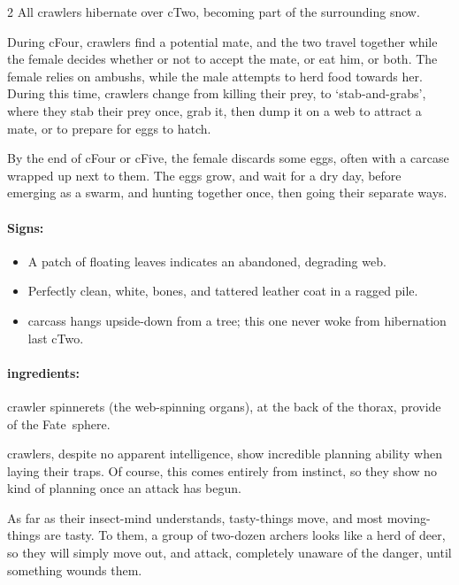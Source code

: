 \begin{multicols}{2}
All \glspl{crawler} hibernate over \gls{cTwo}, becoming part of the surrounding snow.

During \gls{cFour}, \glspl{crawler} find a potential mate, and the two travel together while the female decides whether or not to accept the mate, or eat him, or both.
The female relies on \glspl{ambush}, while the male attempts to herd food towards her.
During this time, \glspl{crawler} change from killing their prey, to `stab-and-grabs', where they stab their prey once, grab it,%
then dump it on a web to attract a mate, or to prepare for eggs to hatch.

By the end of \gls{cFour} or \gls{cFive}, the female discards some eggs, often with a carcase wrapped up next to them.
The eggs grow, and wait for a dry day, before emerging as a swarm, and hunting together once, then going their separate ways.

\crawlerSwarm
\label{crawlerSwarm}


\paragraph{Signs:}

\begin{itemize}
  \item
  A patch of floating leaves indicates an abandoned, degrading web.
  \item
  Perfectly clean, white, bones, and tattered leather coat in a ragged pile.
  \item
   carcass hangs upside-down from a tree; this one never woke from hibernation last \gls{cTwo}.
\end{itemize}

\paragraph{\Glspl{ingredient}:}
\gls{crawler} spinnerets (the web-spinning organs), at the back of the thorax, provide  of the Fate~\gls{sphere}.

\showEnc\label{chitin:tactics}
\Glspl{crawler}, despite no apparent intelligence, show incredible planning ability when laying their traps.
Of course, this comes entirely from instinct, so they show no kind of planning once an attack has begun.

As far as their insect-mind understands, tasty-things move, and most moving-things are tasty.
To them, a group of two-dozen archers looks like a herd of deer, so they will simply move out, and attack, completely unaware of the danger, until something wounds them.


\end{multicols}

